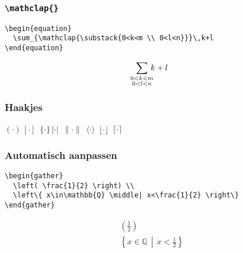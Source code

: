 \begin{frame}[fragile]
  \frametitle{\texttt{\textbackslash mathclap\{\}}}

  \begin{verbatim}
\begin{equation}
  \sum_{\mathclap{\substack{0<k<m \\ 0<l<n}}}\,k+l
\end{equation}
  \end{verbatim}
\begin{equation}
  \sum_{\mathclap{\substack{0<k<m \\ 0<l<n}}}\,k+l
\end{equation}
\end{frame}

\begin{frame}[fragile]
  \frametitle{Haakjes}

  \begin{LTXexample}
$(\cdot) \, [\cdot] \,$
$\{\cdot\}\, |\cdot| \,$
$\|\cdot\| \,$
$\langle\cdot\rangle \,$
$\lfloor\cdot\rfloor \,$
$\lceil\cdot\rceil$
  \end{LTXexample}
\end{frame}

\begin{frame}[fragile]
  \frametitle{Automatisch aanpassen}

  \begin{verbatim}
\begin{gather}
  \left( \frac{1}{2} \right) \\
  \left\{ x\in\mathbb{Q} \middle| x<\frac{1}{2} \right\}
\end{gather}
\end{verbatim}
\begin{gather}
  \left( \frac{1}{2} \right) \\
  \left\{ x\in\mathbb{Q} \,\middle|\, x<\frac{1}{2} \right\}
\end{gather}
\end{frame}

